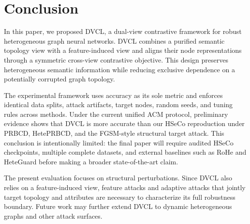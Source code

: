 \section{Conclusion}

In this paper, we proposed DVCL, a dual-view contrastive framework for robust heterogeneous graph neural networks. DVCL combines a purified semantic topology view with a feature-induced view and aligns their node representations through a symmetric cross-view contrastive objective. This design preserves heterogeneous semantic information while reducing exclusive dependence on a potentially corrupted graph topology.

The experimental framework uses accuracy as its sole metric and enforces identical data splits, attack artifacts, target nodes, random seeds, and tuning rules across methods. Under the current unified ACM protocol, preliminary evidence shows that DVCL is more accurate than our HSeCo reproduction under PRBCD, HetePRBCD, and the FGSM-style structural target attack. This conclusion is intentionally limited: the final paper will require audited HSeCo checkpoints, multiple complete datasets, and external baselines such as RoHe and HeteGuard before making a broader state-of-the-art claim.

The present evaluation focuses on structural perturbations. Since DVCL also relies on a feature-induced view, feature attacks and adaptive attacks that jointly target topology and attributes are necessary to characterize its full robustness boundary. Future work may further extend DVCL to dynamic heterogeneous graphs and other attack surfaces.
